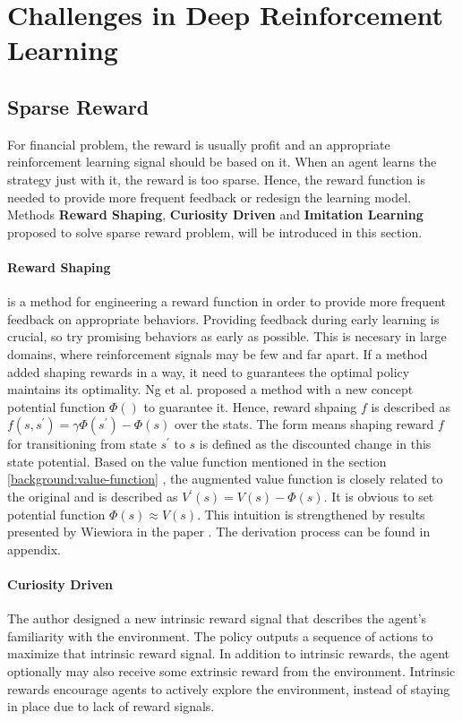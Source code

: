 \section{Challenges in Deep Reinforcement Learning}

\subsection{Sparse Reward}
For financial problem, the reward is usually profit and an appropriate reinforcement learning signal should be based on it. When an agent learns the strategy just with it, the reward is too sparse. Hence, the reward function is needed to provide more frequent feedback or redesign the learning model. Methods \textbf{Reward Shaping},\textbf{ Curiosity Driven} and \textbf{Imitation Learning} proposed to solve sparse reward problem, will be introduced in this section.

\paragraph{Reward Shaping\parencite{Wiewiora2010}} is a method for engineering a reward function in order to provide more frequent feedback on appropriate behaviors. Providing feedback during early learning is crucial, so try promising behaviors as early as possible. This is necesary in large domains, where reinforcement signals may be few and far apart. If a method added shaping rewards in a way, it need to guarantees the optimal policy maintains its optimality. Ng et al. proposed a method with a new concept potential function $\Phi()$ to guarantee it. Hence, reward shpaing $f$ is described as $f(s, s^{\prime}) = \gamma\Phi(s^{\prime}) - \Phi(s)$ over the stats\parencite{Ng1999PolicyIU}. The form means shaping reward $f$ for transitioning from state $s^{\prime}$ to $s$ is defined as the discounted change in this state potential. Based on the value function mentioned in the section \ref{background:value-function} , the augmented value function is closely related to the original and is described as $V^{\prime}(s) = V(s) - \Phi(s)$. It is obvious to set potential function $\Phi(s) \approx V(s)$. This intuition is strengthened by results presented by Wiewiora in the paper \parencite{Wiewiora2003}. The derivation process can be found in appendix.

 
\paragraph{Curiosity Driven \parencite{pathakICMl17curiosity}} The author designed a new intrinsic reward signal that describes the agent’s familiarity with the environment. The policy outputs a sequence of actions to maximize that intrinsic reward signal. In addition to intrinsic rewards, the agent optionally may also receive some extrinsic reward from the environment. Intrinsic rewards encourage agents to actively explore the environment, instead of staying in place due to lack of reward signals.

